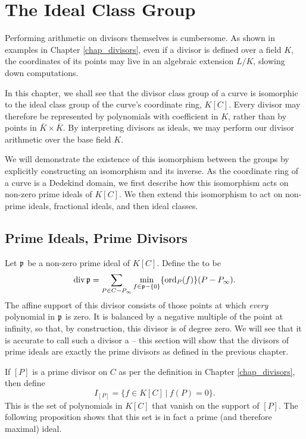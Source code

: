 
\section{The Ideal Class Group}
\label{chap_ideals}

Performing arithmetic on divisors themselves is cumbersome.
As shown in examples in Chapter \ref{chap_divisors},
even if a divisor is defined over a field $K$,
the coordinates of its points may live in an algebraic extension $L/K$,
slowing down computations.

In this chapter, we shall see that the divisor class group of a curve
is isomorphic to the ideal class group of the curve's coordinate ring, $K[C]$.
Every divisor may therefore be represented by polynomials with coefficient in $K$,
rather than by points in $\bar K \times \bar K$.
By interpreting divisors as ideals,
we may perform our divisor arithmetic over the base field $K$.

We will demonstrate the existence of this isomorphism between the groups
by explicitly constructing an isomorphism and its inverse.
As the coordinate ring of a curve is a Dedekind domain,
we first describe how this isomorphism acts on non-zero prime ideals of $K[C]$.
We then extend this isomorphism to act on non-prime ideals, fractional ideals, and then ideal classes.



\subsection{Prime Ideals, Prime Divisors}

Let $\frak p$ be a non-zero prime ideal of $K[C]$.
Define the  to be
  \[ \operatorname{div} \frak p = \sum_{P \in C - P_\infty} \min_{f \in \frak p - \{0\}}\{\operatorname{ord}_P(f)\}(P - P_\infty). \]
The affine support of this divisor consists of those points at which \emph{every} polynomial in $\frak p$ is zero.
It is balanced by a negative multiple of the point at infinity,
so that, by construction, this divisor is of degree zero.
We will see that it is accurate to call such a divisor a  --
this section will show that the divisors of prime ideals are exactly the prime divisors as defined in the previous chapter.

If $[P]$ is a prime divisor on $C$ as per the definition in Chapter \ref{chap_divisors}, then define
\[ I_{[P]} = \{ f \in K[C] ~|~ f(P) = 0 \}. \]
This is the set of polynomials in $K[C]$ that vanish on the support of $[P]$.
The following proposition shows that this set is in fact a prime (and therefore maximal) ideal.

